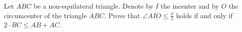 Let $ ABC$ be a non-equilateral triangle. Denote by $ I$ the incenter and by $ O$ the circumcenter of the triangle $ ABC$. Prove that $ \angle AIO\leq\frac{\pi}{2}$ holds if and only if $ 2\cdot BC\leq AB+AC$.